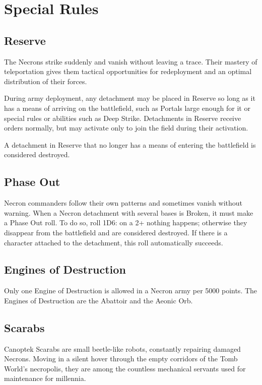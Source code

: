 \section{Special Rules}

\subsection{Reserve}

The Necrons strike suddenly and vanish without leaving a trace. Their mastery of teleportation gives them tactical opportunities for redeployment and an optimal distribution of their forces.

During army deployment, any detachment may be placed in Reserve so long as it has a means of arriving on the battlefield, such as Portals large enough for it or special rules or abilities such as Deep Strike. Detachments in Reserve receive orders normally, but may activate only to join the field during their activation.

A detachment in Reserve that no longer has a means of entering the battlefield is considered destroyed.

\subsection{Phase Out}

Necron commanders follow their own patterns and sometimes vanish without warning. When a Necron detachment with several bases is Broken, it must make a Phase Out roll. To do so, roll 1D6: on a 2+ nothing happens; otherwise they disappear from the battlefield and are considered destroyed. If there is a character attached to the detachment, this roll automatically succeeds.

\subsection{Engines of Destruction}

Only one Engine of Destruction is allowed in a Necron army per 5000 points. The Engines of Destruction are the Abattoir and the Aeonic Orb.

\subsection{Scarabs}

Canoptek Scarabs are small beetle-like robots, constantly repairing damaged Necrons. Moving in a silent hover through the empty corridors of the Tomb World's necropolis, they are among the countless mechanical servants used for maintenance for millennia.

